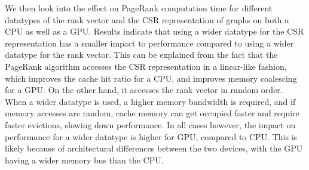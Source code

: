 We then look into the effect on PageRank computation time for different datatypes of the rank vector and the CSR representation of graphs on both a CPU as well as a GPU. Results indicate that using a wider datatype for the CSR representation has a smaller impact to performance compared to using a wider datatype for the rank vector. This can be explained from the fact that the PageRank algorithm accesses the CSR representation in a linear-like fashion, which improves the cache hit ratio for a CPU, and improves memory coalescing for a GPU. On the other hand, it accesses the rank vector in random order. When a wider datatype is used, a higher memory bandwidth is required, and if memory accesses are random, cache memory can get occupied faster and require faster evictions, slowing down performance. In all cases however, the impact on performance for a wider datatype is higher for GPU, compared to CPU. This is likely because of architectural differences between the two devices, with the GPU having a wider memory bus than the CPU.

% 


